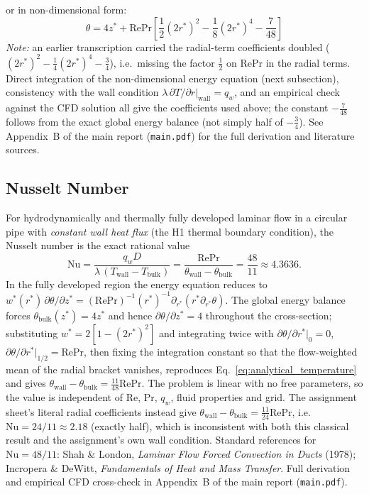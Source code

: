 \documentclass[12pt,a4paper]{article}
\newcommand{\Rey}{\text{Re}}
\newcommand{\Pran}{\text{Pr}}
\begin{document}
or in non-dimensional form:
\begin{equation}
    \theta = 4z^* + \Rey\Pran\left[\frac{1}{2}(2r^*)^2 - \frac{1}{8}(2r^*)^4 - \frac{7}{48}\right]
\end{equation}
\emph{Note:} an earlier transcription carried the radial-term coefficients doubled
($(2r^*)^2-\frac14(2r^*)^4-\frac34$), i.e.\ missing the factor $\tfrac12$ on $\Rey\Pran$ in the
radial terms. Direct integration of the non-dimensional energy equation (next subsection),
consistency with the wall condition $\lambda\,\partial T/\partial r|_{\text{wall}}=q_w$, and an
empirical check against the CFD solution all give the coefficients used above; the constant
$-\tfrac{7}{48}$ follows from the exact global energy balance (not simply half of $-\tfrac34$).
See Appendix~B of the main report (\texttt{main.pdf}) for the full derivation and literature sources.

\subsection{Nusselt Number}

For hydrodynamically and thermally fully developed laminar flow in a circular pipe with
\emph{constant wall heat flux} (the H1 thermal boundary condition), the Nusselt number is the
exact rational value
\begin{equation}
    \text{Nu} = \frac{q_w D}{\lambda\,(T_{\text{wall}}-T_{\text{bulk}})}
              = \frac{\Rey\Pran}{\theta_{\text{wall}}-\theta_{\text{bulk}}}
              = \frac{48}{11} \approx 4.3636 .
\end{equation}
In the fully developed region the energy equation reduces to
$w^*(r^*)\,\partial\theta/\partial z^* = (\Rey\Pran)^{-1}(r^*)^{-1}\partial_{r^*}(r^*\partial_{r^*}\theta)$.
The global energy balance forces $\theta_{\text{bulk}}(z^*)=4z^*$ and hence
$\partial\theta/\partial z^*=4$ throughout the cross-section; substituting
$w^*=2[1-(2r^*)^2]$ and integrating twice with $\partial\theta/\partial r^*|_{0}=0$,
$\partial\theta/\partial r^*|_{1/2}=\Rey\Pran$, then fixing the integration constant so that the
flow-weighted mean of the radial bracket vanishes, reproduces
Eq.~\eqref{eq:analytical_temperature} and gives
$\theta_{\text{wall}}-\theta_{\text{bulk}}=\tfrac{11}{48}\Rey\Pran$. The problem is linear with
no free parameters, so the value is independent of $\Rey$, $\Pran$, $q_w$, fluid properties and
grid. The assignment sheet's literal radial coefficients instead give
$\theta_{\text{wall}}-\theta_{\text{bulk}}=\tfrac{11}{24}\Rey\Pran$, i.e.\ $\text{Nu}=24/11
\approx2.18$ (exactly half), which is inconsistent with both this classical result and the
assignment's own wall condition. Standard references for $\text{Nu}=48/11$: Shah \& London,
\emph{Laminar Flow Forced Convection in Ducts} (1978); Incropera \& DeWitt, \emph{Fundamentals
of Heat and Mass Transfer}. Full derivation and empirical CFD cross-check in
Appendix~B of the main report (\texttt{main.pdf}).
\end{document}
